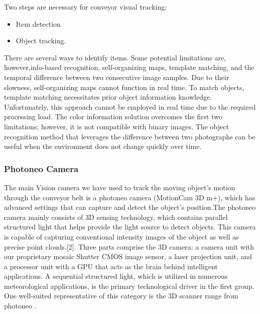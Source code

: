 \documentclass[12pt]{article}
\begin{document}
Two steps are necessary for conveyor visual tracking: \cite{ref12}
\begin{itemize}
\item Item detection
\item Object tracking.
\end{itemize}
There are several ways to identify items. Some potential limitations are, however,info-based recognition, self-organizing maps, template matching, and the temporal difference between two consecutive image samples. Due to their slowness, self-organizing maps cannot function in real time. To match objects, template matching necessitates prior object information knowledge.  Unfortunately, this approach cannot be employed in real time due to the required processing load. The color information solution overcomes the first two limitations; however, it is not compatible with binary images. The object recognition method that leverages the difference between two photographs can be useful when the environment does not change quickly over time\cite{ref12}.
\subsubsection{Photoneo Camera}
The main Vision camera we have used to track the moving object's motion through the conveyor belt is a photoneo camera (MotionCam 3D m+), which has advanced settings that can capture and detect the object's position.The photoneo camera mainly consists of 3D sensing technology, which contains parallel structured light that helps provide the light source to detect objects. This camera is capable of capturing conventional intensity images of the object as well as precise point clouds.[2]. Three parts comprise the 3D camera: a camera unit with our proprietary mosaic Shutter CMOS image sensor, a laser projection unit, and a processor unit with a GPU that acts as the brain behind intelligent applications. A sequential structured light, which is utilized in numerous meteorological applications, is the primary technological driver in the first group. One well-suited representative of this category is the 3D scanner range from photoneo \cite{ref2}. \
\end{document}
